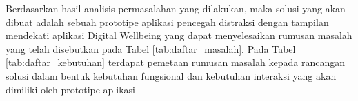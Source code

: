 
Berdasarkan hasil analisis permasalahan yang dilakukan, maka solusi yang akan dibuat adalah sebuah prototipe aplikasi pencegah distraksi dengan tampilan mendekati aplikasi Digital Wellbeing yang dapat menyelesaikan rumusan masalah yang telah disebutkan pada Tabel \ref{tab:daftar_masalah}. Pada Tabel \ref{tab:daftar_kebutuhan} terdapat pemetaan rumusan masalah kepada rancangan solusi dalam bentuk kebutuhan fungsional dan kebutuhan interaksi yang akan dimiliki oleh prototipe aplikasi

